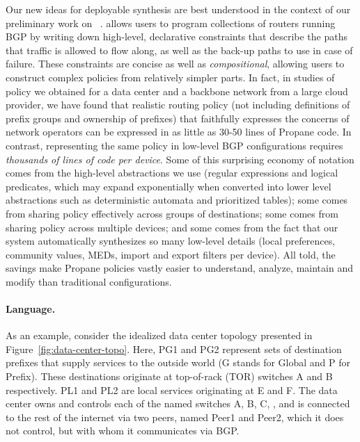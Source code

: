 Our new ideas for deployable synthesis are best understood in the context of
our preliminary work on \Propane~\cite{beckett+:propane}. 
%
\Propane allows users to program collections of routers running BGP
by writing down high-level, declarative constraints that 
describe the paths that traffic is allowed to flow along, as well
as the back-up paths to use in case of failure.  These constraints are
concise as well as {\em compositional}, allowing users to
construct complex policies
from relatively simpler parts.  In fact, in studies of policy we obtained
for a data center 
and a backbone network from a large cloud provider, we have found that 
realistic
routing policy (not including definitions of prefix groups and ownership of
prefixes) that faithfully expresses the concerns of network operators
can be expressed in as little as 30-50 lines of Propane
code.  In contrast, representing the same policy in low-level BGP 
configurations requires \emph{thousands of lines of code per device}.
Some of this surprising economy of notation comes from the high-level 
abstractions we use
(regular expressions and logical predicates, which may expand exponentially
when converted into lower level abstractions such as deterministic
automata and prioritized tables); some comes from sharing
policy effectively across groups of destinations; some comes from
sharing policy across multiple devices; and some comes from the fact
that our system automatically synthesizes so many low-level details (local preferences,
community values, MEDs, import and export filters per device).  All told, 
the savings make Propane policies vastly
easier to understand, analyze, maintain and modify than traditional
configurations.

\paragraph*{Language.}
As an example, consider the idealized data center topology presented in
Figure~\ref{fig:data-center-topo}.  Here, PG1 and PG2 represent sets
of destination prefixes that supply services to the outside world (G stands
for Global and P for Prefix).  These destinations originate at top-of-rack (TOR)
switches A and B respectively.  PL1 and PL2 are local services originating
at E and F.  The data center owns and controls each of the named switches
A, B, C, \etc, and is connected to the rest of the internet via
two peers, named Peer1 and Peer2, which it does not control, but with
whom it communicates via BGP.

